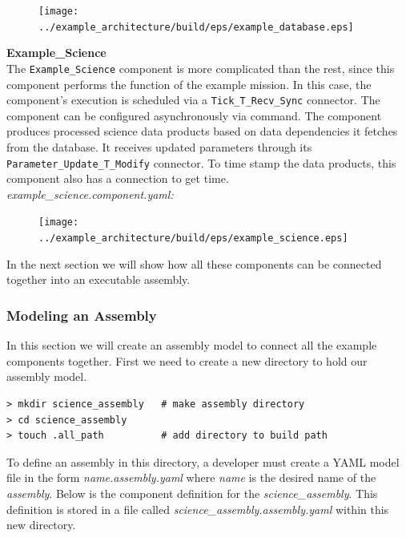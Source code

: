 \begin{figure}[H]
  \texttt{[image: ../example\_architecture/build/eps/example\_database.eps]}
\end{figure}

\textbf{Example\_Science} \\

The \texttt{Example\_Science} component is more complicated than the rest, since this component performs the function of the example mission. In this case, the component's execution is scheduled via a \texttt{Tick\_T\_Recv\_Sync} connector. The component can be configured asynchronously via command. The component produces processed science data products based on data dependencies it fetches from the database. It receives updated parameters through its \texttt{Parameter\_Update\_T\_Modify} connector. To time stamp the data products, this component also has a connection to get time. \\

\textit{example\_science.component.yaml:}

\begin{figure}[H]
  \texttt{[image: ../example\_architecture/build/eps/example\_science.eps]}
\end{figure}

In the next section we will show how all these components can be connected together into an executable assembly.

\subsubsection{Modeling an Assembly} \label{Modeling an Assembly}

In this section we will create an assembly model to connect all the example components together. First we need to create a new directory to hold our assembly model.

\vspace{5mm} %
\begin{verbatim}
> mkdir science_assembly   # make assembly directory
> cd science_assembly
> touch .all_path          # add directory to build path
\end{verbatim}
\vspace{5mm} %

To define an assembly in this directory, a developer must create a YAML model file in the form \textit{name.assembly.yaml} where \textit{name} is the desired name of the \textit{assembly}. Below is the component definition for the \textit{science\_assembly}. This definition is stored in a file called \textit{science\_assembly.assembly.yaml} within this new directory. \\


